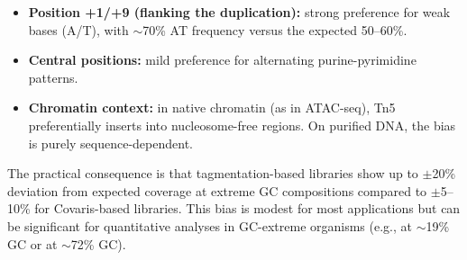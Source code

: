 \begin{itemize}[itemsep=2pt]
  \item \textbf{Position +1/+9 (flanking the duplication):} strong preference for weak bases (A/T), with $\sim$70\% AT frequency versus the expected 50--60\%.
  \item \textbf{Central positions:} mild preference for alternating purine-pyrimidine patterns.
  \item \textbf{Chromatin context:} in native chromatin (as in ATAC-seq), Tn5 preferentially inserts into nucleosome-free regions. On purified DNA, the bias is purely sequence-dependent.
\end{itemize}

The practical consequence is that tagmentation-based libraries show up to $\pm$20\% deviation from expected coverage at extreme GC compositions compared to $\pm$5--10\% for Covaris-based libraries. This bias is modest for most applications but can be significant for quantitative analyses in GC-extreme organisms (e.g.,  at $\sim$19\% GC or  at $\sim$72\% GC).

